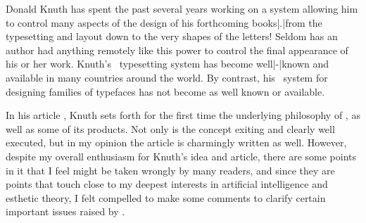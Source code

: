 Donald Knuth has spent the past several years working on a
system allowing him to control many aspects of the design
of his forthcoming books|.|from the typesetting and layout
down to the very shapes of the letters! Seldom has an
author had anything remotely like this power to control the
final appearance of his or her work. Knuth's \TEX\
typesetting system has become well|-|known and available in
many countries around the world. By contrast, his
\METAFONT\ system for designing families of typefaces has
not become as well known or available. 

In his article , 
Knuth sets forth for the first time the underlying 
philosophy of \METAFONT, as well as some of its products. 
Not only is the concept exiting and clearly well executed, 
but in my opinion the article is charmingly written as well.
However, despite my overall enthusiasm for Knuth's idea and 
article, there are some points in it that I feel might be 
taken wrongly by many readers, and since they are points 
that touch close to my deepest interests in artificial 
intelligence and esthetic theory, I felt compelled to make 
some comments to clarify certain important issues raised by 
. 
